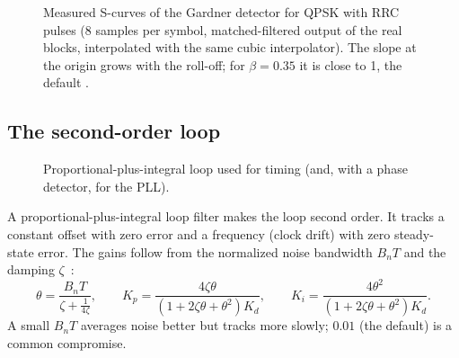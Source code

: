 \begin{figure}[htbp]
\centering
{}
\caption{Measured S-curves of the Gardner detector for QPSK with RRC pulses (8 samples per symbol,
matched-filtered output of the real blocks, interpolated with the same cubic interpolator). The
slope at the origin grows with the roll-off; for $\beta=0.35$ it is close to 1, the default
.}
\label{fig:scurve}
\end{figure}

\subsection{The second-order loop}\label{sec:loop}
\begin{figure}[htbp]
\centering
{}
\caption{Proportional-plus-integral loop used for timing (and, with a phase detector, for the
PLL).}
\end{figure}
A proportional-plus-integral loop filter makes the loop second order. It tracks a constant
offset with zero error and a frequency (clock drift) with zero steady-state error. The gains
follow from the normalized noise bandwidth $B_nT$ and the damping $\zeta$~\cite{mengali1997}:
\begin{equation}
  \theta=\frac{B_nT}{\zeta+\frac{1}{4\zeta}},\qquad
  K_p=\frac{4\zeta\theta}{(1+2\zeta\theta+\theta^2)K_d},\qquad
  K_i=\frac{4\theta^2}{(1+2\zeta\theta+\theta^2)K_d} .
\end{equation}
A small $B_nT$ averages noise better but tracks more slowly; $0.01$ (the default) is a common
compromise.

